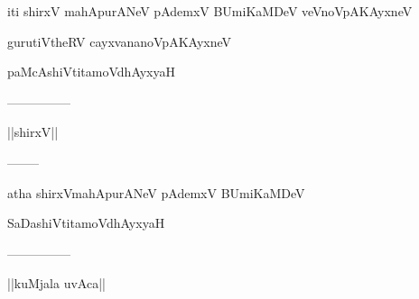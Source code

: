 \documentclass{article}
\begin{document}
\begin{center}
iti shirxV mahApurANeV pAdemxV BUmiKaMDeV veVnoVpAKAyxneV
\end{center}

\begin{center}
gurutiVtheRV cayxvananoVpAKAyxneV
\end{center}

\begin{center}
paMcAshiVtitamoVdhAyxyaH
\end{center}

\begin{center}
---------------
\end{center}

\begin{center}
||shirxV||
\end{center}

\begin{center}
--------
\end{center}

\begin{center}
atha shirxVmahApurANeV pAdemxV BUmiKaMDeV
\end{center}

\begin{center}
SaDashiVtitamoVdhAyxyaH
\end{center}

\begin{center}
---------------
\end{center}

\begin{center}
||kuMjala uvAca||
\end{center}
\end{document}
